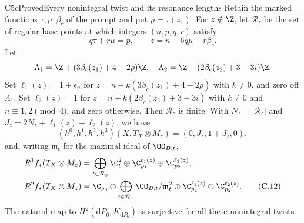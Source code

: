 \begin{statement}{C5c}{Proved}{Every nonintegral twist and its resonance lengths}
Retain the marked functions $\tau,\mu,\beta_c$ of the prompt and put $\rho=\tau(z_1)$. For $z\notin\Z$, let $\mathcal R_z$ be the set of regular base points at which integers $(n,p,q,r)$ satisfy
\[
 q\tau+r\mu=p,\qquad z=n-6q\mu-r\beta_c.               \tag{C.10}
\]
Let
\[
 \Lambda_1=\Z+(3\beta_c(z_1)+4-2\rho)\Z,\quad
 \Lambda_2=\Z+(2\beta_c(z_2)+3-3i)\Z.
\]
Set $\ell_1(z)=1+\epsilon_n$ for $z=n+k(3\beta_c(z_1)+4-2\rho)$ with $k\ne0$, and zero off $\Lambda_1$. Set $\ell_2(z)=1$ for $z=n+k(2\beta_c(z_2)+3-3i)$ with $k\ne0$ and $n\equiv1,2\pmod4$, and zero otherwise. Then $\mathcal R_z$ is finite. With $N_z=|\mathcal R_z|$ and $J_z=2N_z+\ell_1(z)+\ell_2(z)$, we have
\[
 (h^0,h^1,h^2,h^3)(X,T_X\otimes M_z)=(0,J_z,1+J_z,0),  \tag{C.11}
\]
and, writing $\mathfrak m_t$ for the maximal ideal of $\OO_{B,t}$,
\begin{align*}
R^1f_*(T_X\otimes M_z)&=
 \bigoplus_{t\in\mathcal R_z}\C_t^2
 \oplus\C_{p_1}^{\ell_1(z)}\oplus\C_{p_2}^{\ell_2(z)},\\
R^2f_*(T_X\otimes M_z)&=
 \C_{p_0}\oplus\bigoplus_{t\in\mathcal R_z}\OO_{B,t}/\mathfrak m_t^2
 \oplus\C_{p_1}^{\ell_1(z)}\oplus\C_{p_2}^{\ell_2(z)}.\tag{C.12}
\end{align*}
The natural map to $H^2(\mathrm dP_6,K_{\mathrm dP_6})$ is surjective for all these nonintegral twists.
\end{statement}

